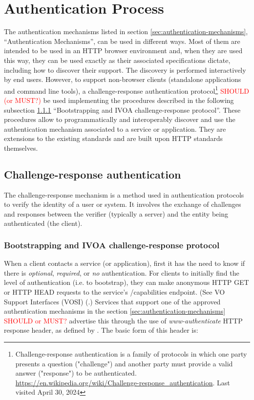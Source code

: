 \documentclass[11pt,a4paper]{ivoa}
\begin{document}
\section{Authentication Process}
\label{sec:auth_discovery}

The authentication mechanisms listed in section
\ref{sec:authentication-mechanisms}, ``Authentication Mechanisms'', 
can be used in different ways. Most of them are intended to
be used in an HTTP browser environment and, when they are used this 
way, they can be used exactly as their associated specifications 
dictate, including how to discover their support. The discovery is 
performed interactively by end users.  
However, to support non-browser clients
(standalone applications and command line tools), a challenge-response 
authentication protocol\footnote{Challenge-response authentication is 
a family of protocols in which one party presents a question 
("challenge") and another party must provide a valid answer 
("response") to be authenticated. 
\url{https://en.wikipedia.org/wiki/Challenge-response_authentication}. 
Last visited April 30, 2024} \textcolor{red}{SHOULD 
(or MUST?)} be used implementing the procedures described in
the following subsection \ref{sec:bootstrapping-challenge} 
``Bootstrapping and IVOA challenge-response protocol''. These procedures 
allow to programmatically and interoperably discover and use the
authentication mechanism associated to a service or application. They 
are extensions to the existing standards and are built upon HTTP 
standards themselves.

\subsection{Challenge-response authentication}
\label{challenge-response-auth}
The challenge-response mechanism is a method used in authentication 
protocols to verify the identity of a user or system. It involves the 
exchange of challenges and responses between the verifier (typically a 
server) and the entity being authenticated (the client).

\subsubsection{Bootstrapping and IVOA challenge-response protocol}
\label{sec:bootstrapping-challenge}
When a client contacts a service (or application), first it has the need
to know if there is \emph{optional}, \emph{required}, or \emph{no} authentication.
For clients to initially find the level of authentication (i.e. to
bootstrap), they can make anonymous HTTP GET or HTTP HEAD requests to
the service's /capabilities endpoint. (See VO Support Interfaces (VOSI)
(\citep{2017ivoa.spec.0524G}.)
Services that support one of the approved authentication mechanisms in the section 
\ref{sec:authentication-mechanisms} \textcolor{red}{SHOULD or MUST?}
advertise this through the use of \emph{www-authenticate} HTTP response
header, as defined by \citep{std:RFC7235}. The basic form of this
header is:
\end{document}
